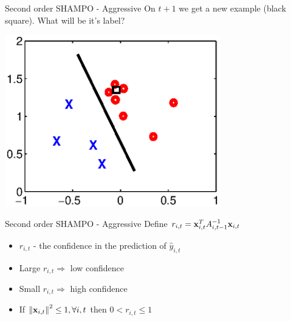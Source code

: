 \documentclass{beamer}
\begin{document}
\begin{frame}{Second order SHAMPO - Aggressive}
On $t+1$ we get a new example (black square). What will be it's label?
\begin{center}
\includegraphics[width=0.7\textwidth]{figs/confidence2.eps}
\end{center}
\end{frame}

\begin{frame}{Second order SHAMPO - Aggressive}
Define $r_{i,t}= \mathbf{x}_{i,t}^TA_{i,t-1}^{-1}\mathbf{x}_{i,t}$  \newline
\begin{itemize}
\item $r_{i,t}$ - the confidence  in the prediction of $\hat{y}_{i,t}$\newline
\item Large $r_{i,t}\Rightarrow$ low confidence \newline
\item Small $r_{i,t}\Rightarrow$ high confidence \newline
\item If $\left\Vert {\mathbf{x}_{i,t}} \right\Vert^2\le1, \forall i,t$ then $0<r_{i,t}\le1$
\end{itemize}
\end{frame}

\end{document}
